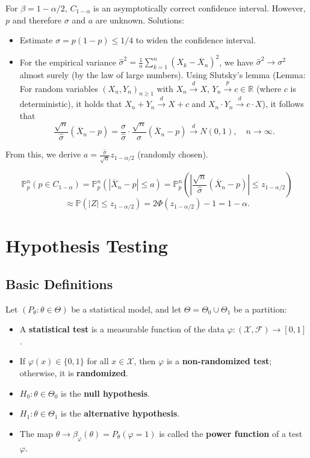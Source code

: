 \documentclass[open=any, 11pt,paper=A4]{scrreprt}
\begin{document}
\begin{example}
For \( \beta = 1 - \alpha/2 \), \( C_{1-\alpha} \) is an asymptotically correct confidence interval. However, \( p \) and therefore \( \sigma \) and \( a \) are unknown. Solutions:

\begin{itemize}
    \item Estimate \( \sigma = p(1 - p) \leq 1/4 \) to widen the confidence interval.
    
    \item For the empirical variance \( \hat{\sigma}^2 = \frac{1}{n} \sum_{k=1}^n (X_k - \overline{X}_n)^2 \), we have \( \hat{\sigma}^2 \to \sigma^2 \) almost surely (by the law of large numbers). Using Slutsky’s lemma (Lemma: For random variables \( (X_n, Y_n)_{n \geq 1} \) with \( X_n \xrightarrow{d} X \), \( Y_n \xrightarrow{p} c \in \mathbb{R} \) (where \( c \) is deterministic), it holds that \( X_n + Y_n \xrightarrow{d} X + c \) and \( X_n \cdot Y_n \xrightarrow{d} c \cdot X \)), it follows that
    \[
    \frac{\sqrt{n}}{\hat{\sigma}} \left( \overline{X}_n - p \right) = \frac{\sigma}{\hat{\sigma}} \cdot \frac{\sqrt{n}}{\sigma} \left( \overline{X}_n - p \right) \xrightarrow{d} N(0,1), \quad n \to \infty.
    \]
\end{itemize}

From this, we derive \( a = \frac{\hat{\sigma}}{\sqrt{n}} z_{1 - \alpha / 2} \) (randomly chosen).

\[
\mathbb{P}_p^n(p \in C_{1 - \alpha}) = \mathbb{P}_p^n \left( |\overline{X}_n - p| \leq a \right) = \mathbb{P}_p^n \left( \left| \frac{\sqrt{n}}{\hat{\sigma}} (\overline{X}_n - p) \right| \leq z_{1 - \alpha / 2} \right)
\]
\[
\approx \mathbb{P}(|Z| \leq z_{1 - \alpha / 2}) = 2 \Phi(z_{1 - \alpha / 2}) - 1 = 1 - \alpha.
\]
\end{example}

\section{Hypothesis Testing}

\subsection{Basic Definitions}
Let \( (P_\theta : \theta \in \Theta) \) be a statistical model, and let \(\Theta = \Theta_0 \cup \Theta_1\) be a partition:
\begin{itemize}
    \item A \textbf{statistical test} is a measurable function of the data \( \varphi : (\mathcal{X}, \mathcal{F}) \to [0,1] \).
    \item If \( \varphi(x) \in \{0,1\} \) for all \( x \in \mathcal{X} \), then \( \varphi \) is a \textbf{non-randomized test}; otherwise, it is \textbf{randomized}.
    \item \( H_0 : \theta \in \Theta_0 \) is the \textbf{null hypothesis}.
    \item \( H_1 : \theta \in \Theta_1 \) is the \textbf{alternative hypothesis}.
    \item The map \( \theta \to \beta_\varphi (\theta) = P_\theta (\varphi = 1) \) is called the \textbf{power function} of a test \( \varphi \).
\end{itemize}
\end{document}
